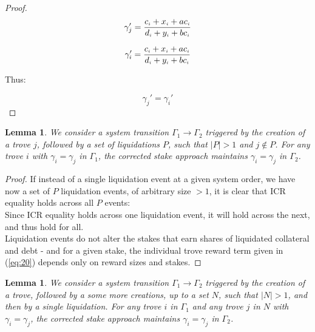 \documentclass[reqno]{article}
\newtheorem{lemma}[theorem]{Lemma}
\begin{document}
\begin{proof}
\begin{equation} 
        \gamma_{j}'=\frac{c_\mathsmaller{i} + x_\mathsmaller{i}+ac_\mathsmaller{i}}{d_\mathsmaller{i}+y_\mathsmaller{i}+bc_\mathsmaller{i}}
\end{equation}

\begin{equation} 
    \gamma_{i}'=\frac{c_\mathsmaller{i}+x_\mathsmaller{i}+ac_\mathsmaller{i}}{d_\mathsmaller{i}+y_\mathsmaller{i}+bc_\mathsmaller{i}}
\end{equation}

\bigskip
Thus:

\begin{equation} 
    \gamma_{j}'=\gamma_{i}'
\end{equation}

\end{proof}

\begin{lemma} \label{result:2} We consider a system transition $\Gamma_1 \rightarrow \Gamma_2$ triggered by the creation of a trove $j$, followed by a set of liquidations $P$, such that $|P| > 1$ and $j \notin P$. For any trove $i$ with $\gamma_i = \gamma_j$ in $\Gamma_1$, the corrected stake approach maintains $\gamma_i = \gamma_j$ in $\Gamma_2$.
\end{lemma}

\begin{proof}
If instead of a single liquidation event at a given system order, we have now a set of $P$ liquidation events, of arbitrary size $> 1$, it is clear that ICR equality holds across all $P$ events:\\

Since ICR equality holds across one liquidation event, it will hold across the next, and thus hold for all.\\

Liquidation events do not alter the stakes that earn shares of liquidated collateral and debt - and for a given stake, the individual trove reward term given in (\ref{eq:20}) depends only on reward sizes and stakes.
\end{proof}

\begin{lemma} \label{result:3}
  We consider a system transition $\Gamma_1 \rightarrow \Gamma_2$ triggered by the creation of a trove, followed by a some more creations, up to a set $N$, such that $|N| > 1$, and then by a single liquidation. For any trove $i$ in $\Gamma_1$ and any trove $j$ in $N$ with $\gamma_i = \gamma_j$, the corrected stake approach maintains $\gamma_i = \gamma_j$ in $\Gamma_2$.
\end{lemma}
\end{document}
